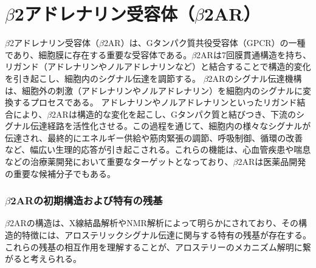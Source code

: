 \newpage

\section{$\beta$2アドレナリン受容体（$\beta$2AR）}\label{sec:b2ar}
$\beta$2アドレナリン受容体（$\beta$2AR）は、Gタンパク質共役受容体（GPCR）の一種であり、細胞膜に存在する重要な受容体である。$\beta$2ARは7回膜貫通構造を持ち、リガンド（アドレナリンやノルアドレナリンなど）と結合することで構造的変化を引き起こし、細胞内のシグナル伝達を調節する。
$\beta$2ARのシグナル伝達機構は、細胞外の刺激（アドレナリンやノルアドレナリン）を細胞内のシグナルに変換するプロセスである。
アドレナリンやノルアドレナリンといったリガンド結合により、$\beta$2ARは構造的な変化を起こし、Gタンパク質と結びつき、下流のシグナル伝達経路を活性化させる。この過程を通じて、細胞内の様々なシグナルが伝達され、最終的にエネルギー供給や筋肉緊張の調節、呼吸制御、循環の改善など、幅広い生理的応答が引き起こされる。これらの機能は、心血管疾患や喘息などの治療薬開発において重要なターゲットとなっており、$\beta$2ARは医薬品開発の重要な候補分子でもある。

\subsubsection*{$\beta$2ARの初期構造および特有の残基} 
$\beta$2ARの構造は、X線結晶解析やNMR解析によって明らかにされており、その構造的特徴には、アロステリックシグナル伝達に関与する特有の残基が存在する。これらの残基の相互作用を理解することが、アロステリーのメカニズム解明に繋がると考えられる。
